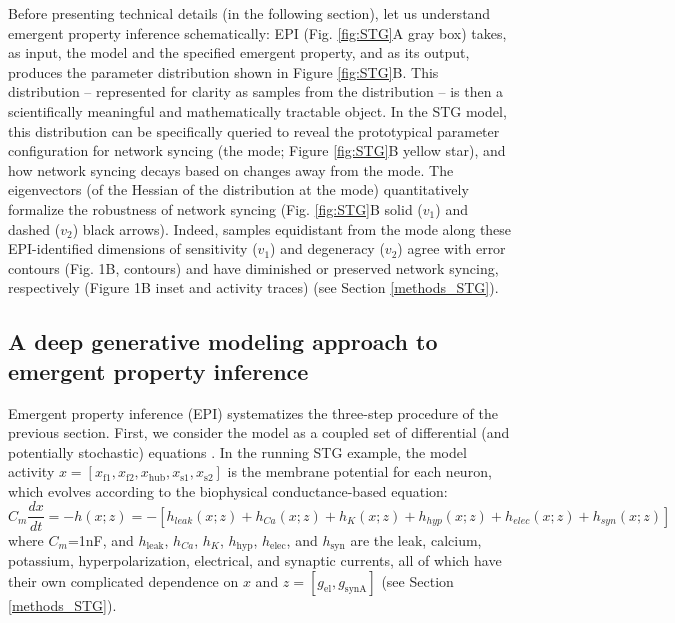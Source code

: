 \documentclass[11pt]{article}
\begin{document}
Before presenting technical details (in the following section), let us understand emergent property inference schematically:  EPI (Fig. \ref{fig:STG}A gray box) takes, as input, the model and the specified emergent property, and as its output, produces the parameter distribution shown in Figure \ref{fig:STG}B.  
This distribution -- represented for clarity as samples from the distribution -- is then a scientifically meaningful and mathematically tractable object.  
In the STG model, this distribution can be specifically queried to reveal the prototypical parameter configuration for network syncing (the mode; Figure \ref{fig:STG}B yellow star), and how network syncing decays based on changes away from the mode.
The eigenvectors (of the Hessian of the distribution at the mode) quantitatively formalize the robustness of network syncing (Fig. \ref{fig:STG}B solid ($v_1$) and dashed  ($v_2$) black arrows).
Indeed, samples equidistant from the mode along these EPI-identified dimensions of sensitivity ($v_1$) and degeneracy ($v_2$) agree with error contours (Fig. 1B, contours) and have diminished or preserved network syncing, respectively (Figure 1B inset and activity traces) (see Section \ref{methods_STG}).

\subsection{A deep generative modeling approach to emergent property inference} \label{results_dgm}

Emergent property inference (EPI) systematizes the three-step procedure of the previous section.
First, we consider the model as a coupled set of differential (and potentially stochastic) equations \cite{gutierrez2013multiple}.  In the running STG example, the model activity $x = \left[ x_{\text{f1}}, x_{\text{f2}}, x_{\text{hub}}, x_{\text{s1}}, x_{\text{s2}} \right]$ is the membrane potential for each neuron, which evolves according to the biophysical conductance-based equation:
\begin{equation} C_m \frac{dx}{dt} = -h(x; z) = - \left[ h_{leak}(x; z) + h_{Ca}(x; z) + h_K(x; z) + h_{hyp}(x; z) + h_{elec}(x; z) + h_{syn}(x; z)\right] 
\end{equation} 
where $C_m$=1nF, and $h_{\text{leak}}$, $h_{Ca}$, $h_K$, $h_{\text{hyp}}$, $h_{\text{elec}}$, and $h_{\text{syn}}$ are the leak, calcium, potassium, hyperpolarization, electrical, and synaptic currents, all of which have their own complicated dependence on $x$ and $z = [g_{\text{el}}, g_{\text{synA}}]$ (see Section \ref{methods_STG}).
\end{document}

